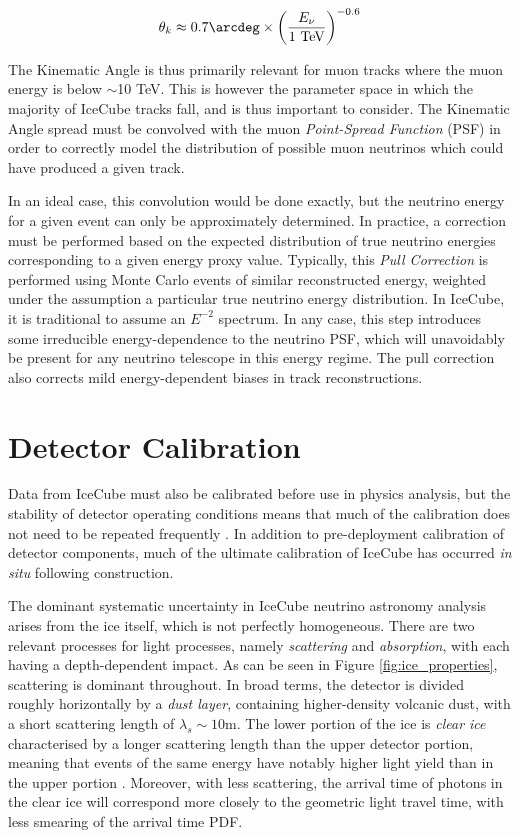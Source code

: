 \begin{equation}
	\theta_{k} \approx 0.7 \arcdeg \times \left( \frac{E_{\nu}}{\textup{1 TeV}} \right)^{-0.6}
\end{equation}

The Kinematic Angle is thus primarily relevant for muon tracks where the muon energy is below $\sim$10 TeV. This is however the parameter space in which the majority of IceCube tracks fall, and is thus important to consider. The Kinematic Angle spread must be convolved with the muon \emph{Point-Spread Function} (PSF) in order to correctly model the distribution of possible muon neutrinos which could have produced a given track.

In an ideal case, this convolution would be done exactly, but the neutrino energy for a given event can only be approximately determined. In practice, a correction must be performed based on the expected distribution of true neutrino energies corresponding to a given energy proxy value. Typically, this \emph{Pull Correction} is performed using Monte Carlo events of similar reconstructed energy, weighted under the assumption a particular true neutrino energy distribution. In IceCube, it is traditional to assume an $E^{-2}$ spectrum. In any case, this step introduces some irreducible energy-dependence to the neutrino PSF, which will unavoidably be present for any neutrino telescope in this energy regime. The pull correction also corrects mild energy-dependent biases in track reconstructions.

\section{Detector Calibration}
\label{sec:calibration}

Data from IceCube must also be calibrated before use in physics analysis, but the stability of detector operating conditions means that much of the calibration does not need to be repeated frequently \cite{icecube_detector_17}. In addition to pre-deployment calibration of detector components, much of the ultimate calibration of IceCube has occurred \emph{in situ} following construction.

The dominant systematic uncertainty in IceCube neutrino astronomy analysis arises from the ice itself, which is not perfectly homogeneous. There are two relevant processes for light processes, namely \emph{scattering} and \emph{absorption}, with each having a depth-dependent impact. As can be seen in Figure \ref{fig:ice_properties}, scattering is dominant throughout. In broad terms, the detector is divided roughly horizontally by a \emph{dust layer}, containing higher-density volcanic dust, with a short scattering length of $\lambda_{s} \sim 10$m. The lower portion of the ice is \emph{clear ice} characterised by a longer scattering length than the upper detector portion, meaning that events of the same energy have notably higher light yield than in the upper portion . Moreover, with less scattering, the arrival time of photons in the clear ice will correspond more closely to the geometric light travel time, with less smearing of the arrival time PDF. 

